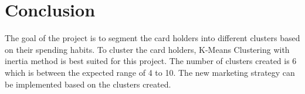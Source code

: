 \documentclass{article}
\begin{document}
    \hfill

    \begingroup
        \section {Conclusion}

        The goal of the project is to segment the card holders into different clusters based on their spending habits. 
        To cluster the card holders, K-Means Clustering with inertia method is best suited for this project.
        The number of clusters created is 6 which is between the expected range of 4 to 10.
        The new marketing strategy can be implemented based on the clusters created.
    \endgroup
\end{document}
